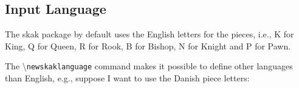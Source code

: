 \documentclass[10pt]{article}
\newcommand{\package}[1]{\textsf{#1}}
\newcommand{\command}[1]{\textbackslash\texttt{#1}}
\begin{document}
\subsection{Input Language}
\label{sec:input-language}

The \package{skak} package by default uses the English letters for the
pieces, i.e., K for King, Q for Queen, R for Rook, B for Bishop, N for
Knight and P for Pawn.

The \command{newskaklanguage} command makes it possible to define
other languages than English, e.g., suppose I want to use the Danish
piece letters:

\begin{LTXexample}

\skaklanguage[danish]

\newgame
{} 
\end{LTXexample}
\end{document}
